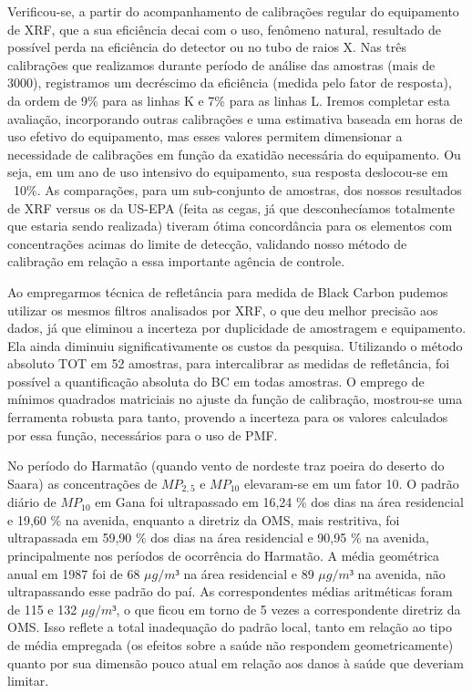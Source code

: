 Verificou-se, a partir do acompanhamento de calibrações regular do equipamento de XRF, que a sua eficiência decai com o uso, fenômeno natural, resultado de possível perda na eficiência do detector ou no tubo de raios X. Nas três calibrações que realizamos durante período de análise das amostras (mais de 3000), registramos um decréscimo da eficiência (medida pelo fator de resposta), da ordem de 9\% para as linhas K e 7\% para as linhas L. Iremos completar esta avaliação, incorporando outras calibrações e uma estimativa baseada em horas de uso efetivo do equipamento, mas esses valores permitem dimensionar a necessidade de calibrações em função da exatidão necessária do equipamento. Ou seja, em um ano de uso intensivo do equipamento, sua resposta deslocou-se em ~10\%.
%
%
As comparações, para um sub-conjunto de amostras, dos nossos resultados de XRF versus os da US-EPA (feita as cegas, já que desconhecíamos totalmente que estaria sendo realizada) tiveram ótima concordância para os elementos com concentrações acimas do limite de detecção, validando nosso método de calibração em relação a essa importante agência de controle.%
%
%   

Ao empregarmos técnica de refletância para medida de Black Carbon pudemos utilizar os mesmos filtros analisados por XRF, o que deu melhor precisão aos dados, já que eliminou a incerteza por duplicidade de amostragem e equipamento. Ela ainda diminuiu significativamente os custos da pesquisa. Utilizando o método absoluto TOT em 52 amostras, para intercalibrar as medidas de refletância, foi possível a quantificação absoluta do BC em todas amostras. O emprego de mínimos quadrados matriciais no ajuste da função de calibração, mostrou-se uma ferramenta robusta para tanto, provendo a incerteza para os valores calculados por essa função, necessários para o uso de PMF.

No período do Harmatão (quando vento de nordeste traz poeira do deserto do Saara) as concentrações de $MP_{2,5}$ e $MP_{10}$ elevaram-se em um fator 10. O padrão diário de $MP_{10}$ em Gana foi ultrapassado em 16,24 \% dos dias na área residencial e 19,60 \% na avenida, enquanto a diretriz da OMS, mais restritiva, foi ultrapassada em 59,90 \% dos dias na área residencial e 90,95 \% na avenida, principalmente nos períodos de ocorrência do Harmatão. A média geométrica anual em 1987 foi de 68 $\mu g/m³$ na área residencial e 89 $\mu g/m³$ na avenida, não ultrapassando esse padrão do paí. As correspondentes médias aritméticas foram de 115 e 132 $\mu g/m³$, o que ficou em torno de 5 vezes a correspondente diretriz da OMS. Isso reflete a total inadequação do padrão local, tanto em relação ao tipo de média empregada (os efeitos sobre a saúde não respondem geometricamente) quanto por sua dimensão pouco atual em relação aos danos à saúde que deveriam limitar.

